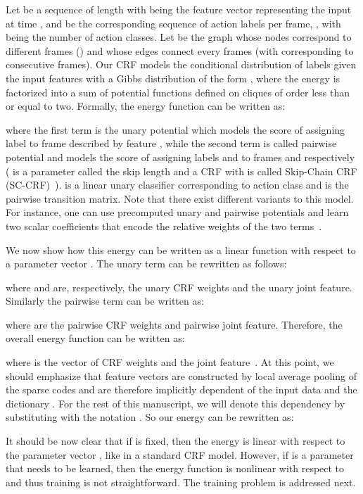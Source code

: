 \documentclass[10pt,twocolumn,letterpaper]{article}
\begin{document}
 Let  be a sequence of length  with  being the feature vector representing the input at time , and  be the corresponding sequence of action labels per frame, , with  being the number of action classes. Let  be the graph whose nodes correspond to different frames () and whose edges connect every  frames (with  corresponding to consecutive frames). Our CRF models the conditional distribution of labels given the input features with a Gibbs distribution of the form , where the energy  is factorized into a sum of potential functions defined on cliques of order less than or equal to two. Formally, the energy function can be written as:

where the first term is the unary potential which models the score of assigning label  to frame  described by feature , while the second term is called pairwise potential and models the score of assigning labels  and  to frames  and  respectively ( is a parameter called the skip length and a CRF with  is called Skip-Chain CRF (SC-CRF)~\cite{Lea:WACV15,Lea:ICRA16}).  is a linear unary classifier corresponding to action class  and  is the pairwise transition matrix. Note that there exist different variants to this model. For instance, one can use precomputed unary and pairwise potentials and learn two scalar coefficients that encode the relative weights of the two terms~\cite{Tao:ECCV14}. 

We now show how this energy can be written as a linear function with respect to a parameter vector . The unary term can be rewritten as follows:

where  and  are, respectively, the unary CRF weights and the unary joint feature. Similarly the pairwise term can be written as:

where  are the pairwise CRF weights and pairwise joint feature. Therefore, the overall energy function can be written as:

where  is the vector of CRF weights and  the joint feature~\cite{Joachims:JMLR09}. At this point, we should emphasize that feature vectors  are constructed by local average pooling of the sparse codes and are therefore implicitly dependent of the input data  and the dictionary . For the rest of this manuscript, we will denote this dependency by substituting  with the notation . So our energy can be rewritten as: 

It should be now clear that if  is fixed, then the energy is linear with respect to the parameter vector , like in a standard CRF model. However, if  is a parameter that needs to be learned, then the energy function is nonlinear with respect to  and thus training is not straightforward. The training problem is addressed next.
\end{document}
